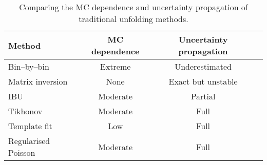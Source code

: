 \begin{table}
    \centering
    \begin{tabular}{lccc}
        \hline
        Method              & MC dependence & Uncertainty propagation \\
        \hline
        Bin--by--bin        & Extreme       & Underestimated \\
        Matrix inversion    & None          & Exact but unstable \\
        IBU                 & Moderate      & Partial \\
        Tikhonov            & Moderate      & Full \\
        Template fit        & Low           & Full \\
        Regularised Poisson & Moderate      & Full\\
        \hline
    \end{tabular}
    \caption{Comparing the MC dependence and uncertainty propagation of traditional unfolding methods.}
    \label{tab:binned-comp}
\end{table}

